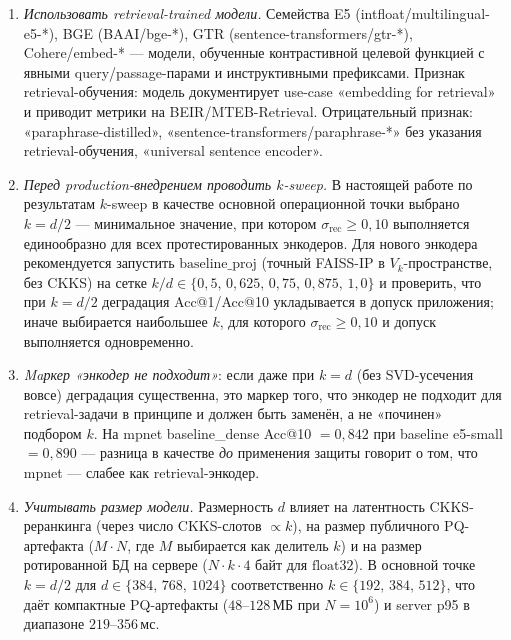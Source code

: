 \documentclass[a4paper, 12pt, oneside, openany]{article}
\begin{document}
\begin{enumerate}
\item \emph{Использовать retrieval-trained модели.} Семейства E5 (intfloat/multilingual-e5-*), BGE (BAAI/bge-*), GTR (sentence-transformers/gtr-*), Cohere/embed-* --- модели, обученные контрастивной целевой функцией с явными query/passage-парами и инструктивными префиксами. Признак retrieval-обучения: модель документирует use-case «embedding for retrieval» и приводит метрики на BEIR/MTEB-Retrieval. Отрицательный признак: «paraphrase-distilled», «sentence-transformers/paraphrase-*» без указания retrieval-обучения, «universal sentence encoder».

\item \emph{Перед production-внедрением проводить $k$-sweep.} В настоящей работе по результатам $k$-sweep в качестве основной операционной точки выбрано $k = d/2$ --- минимальное значение, при котором $\sigma_{\mathrm{rec}} \geq 0{,}10$ выполняется единообразно для всех протестированных энкодеров. Для нового энкодера рекомендуется запустить $\mathrm{baseline\_proj}$ (точный FAISS-IP в $V_k$-пространстве, без CKKS) на сетке $k/d \in \{0{,}5,\,0{,}625,\,0{,}75,\,0{,}875,\,1{,}0\}$ и проверить, что при $k = d/2$ деградация Acc@1/Acc@10 укладывается в допуск приложения; иначе выбирается наибольшее $k$, для которого $\sigma_{\mathrm{rec}} \geq 0{,}10$ и допуск выполняется одновременно.

\item \emph{Maркер «энкодер не подходит»}: если даже при $k = d$ (без SVD-усечения вовсе) деградация существенна, это маркер того, что энкодер не подходит для retrieval-задачи в принципе и должен быть заменён, а не «починен» подбором $k$. На mpnet baseline\_dense Acc@10 $= 0{,}842$ при baseline e5-small $= 0{,}890$ --- разница в качестве \emph{до} применения защиты говорит о том, что mpnet --- слабее как retrieval-энкодер.

\item \emph{Учитывать размер модели.} Размерность $d$ влияет на латентность CKKS-реранкинга (через число CKKS-слотов $\propto k$), на размер публичного PQ-артефакта ($M \cdot N$, где $M$ выбирается как делитель $k$) и на размер ротированной БД на сервере ($N \cdot k \cdot 4$ байт для $\mathrm{float32}$). В основной точке $k = d/2$ для $d \in \{384,\,768,\,1024\}$ соответственно $k \in \{192,\,384,\,512\}$, что даёт компактные PQ-артефакты ($48$--$128$\,МБ при $N = 10^6$) и server p95 в диапазоне $219$--$356$\,мс.
\end{enumerate}
\end{document}
